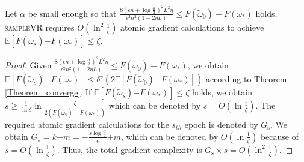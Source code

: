 \documentclass[letterpaper]{article}
\begin{document}
\begin{Theorem}
\label{theorem_gradient_complexity}
Let $\alpha$ be small enough so that $\frac{8(\epsilon n+\log\frac{\alpha}{2})^2L^2\eta}{\epsilon^2n^2(1-2\eta L)}\le F(\tilde{\omega}_0) - F(\omega_\ast)$ holds, \textsc{sampleVR} requires $O(\ln^2\frac{1}{\epsilon})$ atomic gradient calculations  to achieve $\mathbb{E}[F(\tilde{\omega}_s)\mathrm{-}F(\omega_\ast)] \le \zeta$.
\end{Theorem}
\begin{proof}
Given $\frac{8(\epsilon n+\log\frac{\alpha}{2})^2L^2\eta}{\epsilon^2n^2(1-2\eta L)}\le F(\tilde{\omega}_0) - F(\omega_\ast)$, we obtain $\mathbb{E}[F(\tilde{\omega}_{s}) \mathrm{-} F(\omega_\ast)]  \le \delta^s \left(2\mathbb{E}[F(\tilde{\omega}_0)\mathrm{-}F(\omega_\ast)]\right)$ according to Theorem \ref{Theorem_converge}. If $\mathbb{E}[F(\tilde{\omega}_{s}) \mathrm{-} F(\omega_\ast)]  \le \zeta$ holds, we obtain $s\ge\frac{1}{\ln \delta}\ln \frac{\zeta}{2(F(\tilde{\omega}_0)-F(\omega_\ast))}$ which can be denoted by $s=O(\ln \frac{1}{\zeta})$.  The required atomic gradient calculations for the $s_{th}$ epoch is denoted by $G_\mathrm{s}$. We obtain $G_s = k \mathrm{+}m = \mathrm{-} \frac{s\log\frac{\alpha}{2}}{\epsilon}\mathrm{+}m$, which can be denoted by $O(\ln\frac{1}{\zeta})$ because of $s=O(\ln \frac{1}{\zeta})$. Thus, the total  gradient complexity is $G_\mathrm{s}\times s=O(\ln^2\frac{1}{\zeta})$.
\end{proof}
\end{document}
